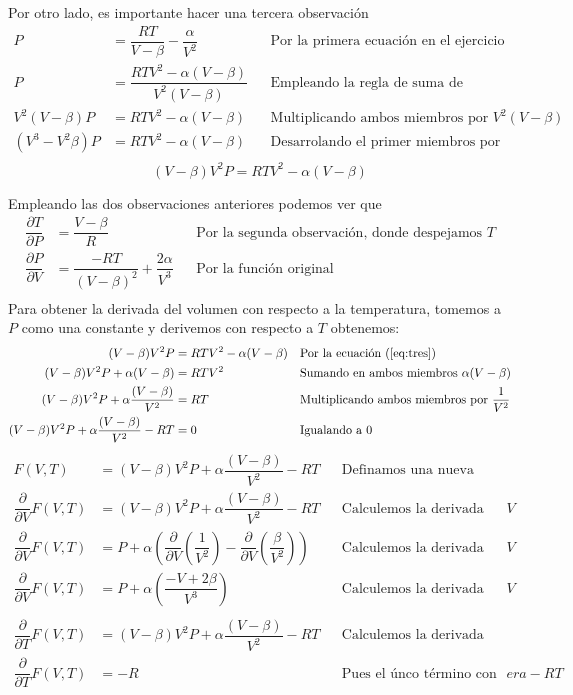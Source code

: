 \documentclass[letterpaper]{article}
\renewcommand{\d}{\partial}
\renewcommand{\*}{\cdot}
\theoremstyle{definition}
\begin{document}
Por otro lado, es importante hacer una tercera observación
\begin{align*}
	P &= \dfrac{RT}{V - \beta} - \dfrac{\alpha}{V^2} &&\text{Por la primera ecuación en el ejercicio}\\
	P &=  \dfrac{RTV^2-\alpha(V- \beta)}{V^2(V - \beta)} &&\text{Empleando la regla de suma de fracciones}\\
	V^2(V - \beta)P &=  RTV^2-\alpha(V- \beta) &&\text{Multiplicando ambos miembros por }V^2(V - \beta)\\
	(V^3 - V^2\beta)P &=  RTV^2-\alpha(V- \beta) &&\text{Desarrolando el primer miembros por distributividad}\\
\end{align*}
\[ (V - \beta)V^2 P = RTV^2 - \alpha(V - \beta) \label{eq:tres}\tag{3}  \]

Empleando las dos observaciones anteriores podemos ver que
\begin{align*}
	\dfrac{\d T}{\d P} &= \dfrac{V - \beta}{R} &&\text{Por la segunda observación, donde despejamos }T \label{eq:cuatro}\tag{4} \\
	\dfrac{\d P}{\d V} &= \dfrac{-RT}{(V - \beta)^2}  + \dfrac{2\alpha}{V^3}&&\text{Por la función original} \label{eq:cinco}\tag{5} \\\
\end{align*}
Para obtener la derivada del volumen con respecto a la temperatura, tomemos a $ P $ como una constante y derivemos con respecto a $ T $ obtenemos:
\begin{align*}
(V - \beta)V^2 P &= RTV^2 - \alpha(V - \beta) &&\text{Por la ecuación (\ref{eq:tres})}\\
(V - \beta)V^2 P + \alpha(V - \beta) &= RTV^2 &&\text{Sumando en ambos miembros }\alpha(V - \beta)\\
(V - \beta)V^2 P + \alpha\dfrac{(V - \beta)}{V^2} &= RT &&\text{Multiplicando ambos miembros por }\dfrac{1}{V^2}\\
(V - \beta)V^2 P + \alpha\dfrac{(V - \beta)}{V^2} - RT &= 0 &&\text{Igualando a } 0
\end{align*}
\begin{align*}
	F(V,T) &= (V - \beta)V^2 P + \alpha\dfrac{(V - \beta)}{V^2} - RT &&\text{Definamos una nueva función auxiliar como sigue}\\
	\dfrac{\d }{\d V}F(V,T) &= (V - \beta)V^2 P + \alpha\dfrac{(V - \beta)}{V^2} - RT &&\text{Calculemos la derivada parcial con respecto a }V\\
	\dfrac{\d }{\d V}F(V,T) &= P + \alpha\left(\dfrac{\d}{\d V}\left(\dfrac{1}{V^2}\right) - \dfrac{\d}{\d V}\left(\dfrac{\beta}{V^2}\right) \right) &&\text{Calculemos la derivada parcial con respecto a }V\\
	\dfrac{\d }{\d V}F(V,T) &= P + \alpha\left(\dfrac{-V + 2\beta}{ V^3 } \right) &&\text{Calculemos la derivada parcial con respecto a }V\\
	\\
	\dfrac{\d }{\d T}F(V,T) &= (V - \beta)V^2 P + \alpha\dfrac{(V - \beta)}{V^2} - RT &&\text{Calculemos la derivada parcial con respecto a T}\\
	\dfrac{\d }{\d T}F(V,T) &= -R &&\text{Pues el únco término con T} era -RT\\
\end{align*}
\end{document}
